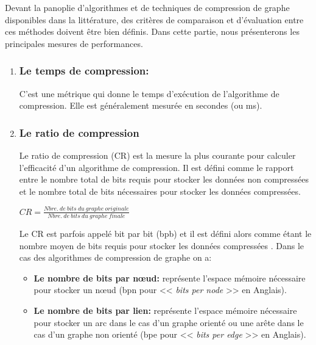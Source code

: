 	
				Devant la panoplie d'algorithmes et de techniques de compression de graphe disponibles dans la littérature, des critères de comparaison  et d'évaluation entre ces méthodes doivent être bien définis. Dans cette partie, nous présenterons les principales mesures de performances.
				
				\begin{enumerate}[label=\alph*)]
					\item \subsubsection{Le temps de compression:}
				C'est une métrique qui donne le temps d'exécution de l'algorithme de compression. Elle est généralement mesurée en secondes (ou ms).
				
				\item 	\subsubsection{Le ratio de compression }
				Le ratio de compression (CR) est la mesure la plus courante pour calculer l'efficacité d'un algorithme de compression. Il est défini comme le rapport entre le nombre total de bits requis pour stocker les données non compressées et le nombre total de bits nécessaires pour stocker les données compressées.
				\begin{center}
				$
				CR = \frac{Nbre.\ de\ bits\ du\ graphe\ originale}{Nbre.\ de\ bits\ du\ graphe\ finale }
				$
				\end{center}
				
				
				Le CR est parfois appelé bit par bit (bpb) et il est défini alors comme étant le nombre moyen de bits requis pour stocker les données compressées \citep{uthayakumar2018survey}. Dans le cas des algorithmes de compression de graphe on a:
				\begin{itemize}
					\item \textbf{Le nombre de bits par nœud:}
					représente l'espace mémoire nécessaire pour stocker un nœud (bpn pour << \textit{bits per node} >> en Anglais).
					
					\item \textbf{Le nombre de bits par lien:}
					représente l'espace mémoire nécessaire pour stocker un arc dans le cas d'un graphe orienté ou une arête dans le cas d'un graphe non orienté (bpe pour << \textit{bits per edge} >> en Anglais).
				\end{itemize}
				

\end{enumerate}
